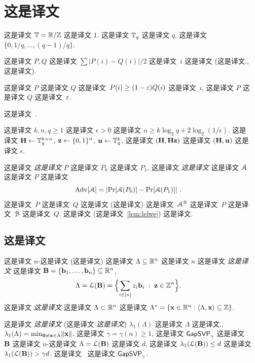 \section{这是译文}
\label{sec:preliminaries}

这是译文 $\T =
\R/\Z$ 这是译文 $1$. 这是译文 $\T_q$ 这是译文 $q$, 这是译文 $\{0,1/q,\ldots,(q-1)/q\}$.

这是译文 $P,Q$ 这是译文 $\sum |P(i)-Q(i)|/2$ 这是译文~$i$ 这是译文 (这是译文.,~\cite[Eq.~(2.3)]{AldousDiaconis87} 这是译文).
\begin{claim}\label{clm:separationdist}  这是译文 $P$ 这是译文 $Q$ 这是译文~$P(i) \ge
  (1-\eps)Q(i)$ 这是译文~$i$, 这是译文 $P$ 这是译文 $Q$ 这是译文~$\eps$.
\end{claim}



这是译文~\cite{DBLP:journals/siamcomp/HastadILL99}.

\begin{lemma}
  \label{lem:lhl}  这是译文 $k, n, q \ge 1$ 这是译文 $\epsilon > 0$ 这是译文 $n
  \ge k \log_2 q + 2 \log_2 (1/\epsilon)$. 这是译文 $\mx{H} \gets \T_q^{k \times
    n}$, $\vc{z} \gets \binset^n$, $\vc{u} \gets \bbT_q^k$, 这是译文 $(\mx{H}, \mx{H}\vc{z})$ 这是译文 $(\mx{H}, \vc{u})$ 这是译文 $\epsilon$.
\end{lemma}


这是译文 \emph{这是译文} $P$ 这是译文 $P_0$ 这是译文 $P_1$, 这是译文 \emph{这是译文} 这是译文 $\cA$ 这是译文 $P$ 这是译文 \[
\adv[\cA] = \abs{\Pr[\cA(P_0)] - \Pr[\cA(P_1)]}~.
\] 这是译文~$P$ 这是译文~$Q$ 这是译文 (这是译文) 这是译文~$\cA^{\cB}$ 这是译文~$P$ 这是译文~$\cB$ 这是译文~$Q$. 这是译文 (这是译文~\ref{lem:lelwe}) 这是译文. 


\subsection{这是译文}
\label{sec:lattices}

这是译文 $n$-这是译文 (这是译文) 这是译文 $\Lambda \subseteq \R^n$ 这是译文 $n$ 这是译文 \emph{这是译文} 这是译文 $\matB = \set{\vecb_{1}, \ldots,
  \vecb_{n}} \subseteq \R^n$, \[ \Lambda = \lat(\matB) = \set[\Big]{
  \sum_{i \in [n]} z_i \vecb_i\; :\; \vecz \in \mathbb{Z}^n }. \] 这是译文 \emph{这是译文} 这是译文 $\Lambda \subset \R^n$ 这是译文 $\Lambda^* = \set{ \vecx \in \R^n : \inner{\Lambda,\vecx} \subseteq \Z}$.

这是译文 \emph{这是译文} (这是译文 \emph{这是译文}) $\lambda_1(\Lambda)$ 这是译文 $\Lambda$ 这是译文., $\lambda_1(\Lambda) = \min_{\veczero \neq
  \vecx \in \Lambda} \length{\vecx}$.  这是译文 $\gamma = \gamma(n) \ge 1$, 这是译文 $\gapsvp_\gamma$ 这是译文 $\matB$ 这是译文 $n$-这是译文 $\Lambda = \lat(\matB)$ 这是译文 $d$, 这是译文 $\lambda_1(\lat(\matB)) \le d$  这是译文 $\lambda_1(\lat(\matB)) > \gamma d$. 这是译文~\cite{KhotLLL25,RegevLLL25} 这是译文 $\gapsvp_\gamma$. 


